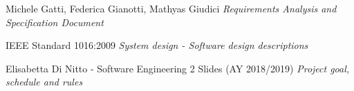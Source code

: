 \begin{thebibliography}{9} \label{Bibliography}

	Michele Gatti, Federica Gianotti, Mathyas Giudici \emph{Requirements Analysis and Specification Document}

	IEEE Standard 1016:2009 \emph{System design - Software design descriptions}

  Elisabetta Di Nitto - Software Engineering 2 Slides (AY 2018/2019) \emph{Project goal, schedule and rules}

\end{thebibliography}
